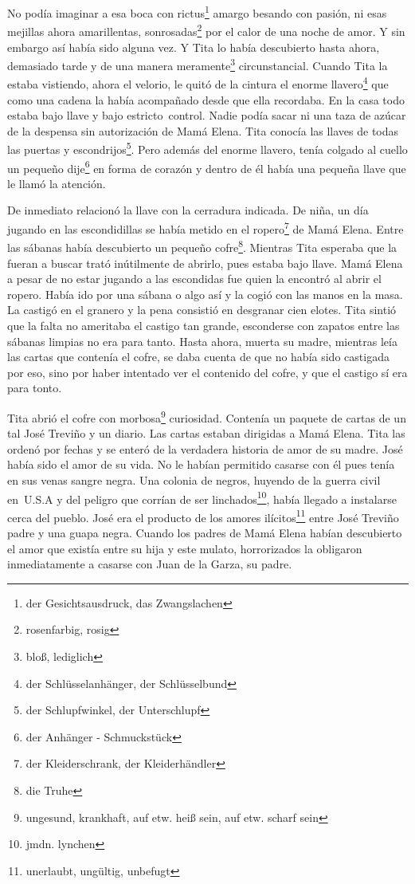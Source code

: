 No podía imaginar a esa boca con rictus\footnote{der Gesichtsausdruck, das Zwangslachen}
amargo besando con pasión, ni esas mejillas ahora amarillentas, sonrosadas\footnote{rosenfarbig, rosig} por el calor de una noche
de amor. Y sin embargo así había sido alguna vez. Y Tita lo había
descubierto hasta ahora, demasiado tarde y de una manera meramente\footnote{bloß, lediglich}
circunstancial. Cuando Tita la estaba vistiendo, ahora el velorio, le
quitó de la cintura el enorme llavero\footnote{der Schlüsselanhänger, der Schlüsselbund}
que como una cadena la había acompañado desde que ella recordaba. En
la casa todo estaba bajo llave y bajo estricto~control. Nadie
podía sacar ni una taza de azúcar de la despensa sin autorización de
Mamá Elena. Tita conocía las llaves de todas las puertas y escondrijos\footnote{der Schlupfwinkel, der Unterschlupf}.
Pero además del enorme llavero, tenía colgado al cuello un pequeño dije\footnote{der Anhänger - Schmuckstück} en forma
de corazón y dentro de él había una pequeña llave que le llamó la atención.

De inmediato relacionó la llave con la cerradura indicada. De niña, un
día jugando en las escondidillas se había metido en el ropero\footnote{der Kleiderschrank, der Kleiderhändler}
de Mamá Elena. Entre las sábanas había descubierto un pequeño cofre\footnote{die Truhe}.
Mientras Tita esperaba que la fueran a buscar trató inútilmente de abrirlo,
pues estaba bajo llave. Mamá Elena a pesar de no estar jugando a las
escondidas fue quien la encontró al abrir el ropero. Había ido por una
sábana o algo así y la cogió con las manos en la masa. La castigó en el
granero y la pena consistió en desgranar cien elotes. Tita sintió que la
falta no ameritaba el castigo tan grande, esconderse con zapatos entre
las sábanas limpias no era para tanto. Hasta ahora, muerta su madre,
mientras leía las cartas que contenía el cofre, se daba cuenta de que no
había sido castigada por eso, sino por haber intentado ver el contenido
del cofre, y que el castigo sí era para tonto.

Tita abrió el cofre con morbosa\footnote{ungesund, krankhaft, auf etw. heiß sein, auf etw. scharf sein}
curiosidad. Contenía un paquete de cartas de un tal José Treviño y un
diario. Las cartas estaban dirigidas a Mamá Elena. Tita las ordenó por
fechas y se enteró de la verdadera historia de amor de su madre. José
había sido el amor de su vida. No le habían permitido casarse con él
pues tenía en sus venas sangre negra.
Una colonia de negros, huyendo de la guerra civil en~U.S.A y del
peligro que corrían de ser linchados\footnote{jmdn. lynchen},
había llegado a instalarse cerca del pueblo. José era el producto de los
amores ilícitos\footnote{unerlaubt, ungültig, unbefugt} entre José
Treviño padre y una guapa negra. Cuando los padres de Mamá Elena habían
descubierto el amor que existía entre su hija y este mulato,
horrorizados la obligaron inmediatamente a casarse con Juan de la Garza,
su padre.

